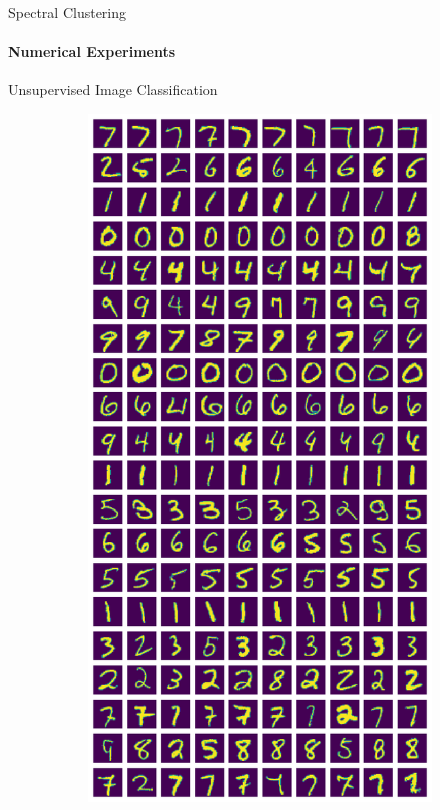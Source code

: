 \documentclass[10pt,a4paper, nocenter]{beamer}
\begin{document}
	
	\begin{frame}{Spectral Clustering}
	\framesubtitle{Numerical Experiments}
	Unsupervised Image Classification
	\begin{figure}[h]
		\begin{center}
			\begin{subfigure}[b]{0.4\textwidth}
				\centering
				\includegraphics[height={0.6\textheight}]{../../images/number_clustering.png}

\end{subfigure}
\end{center}
\end{figure}
\end{frame}
\end{document}
